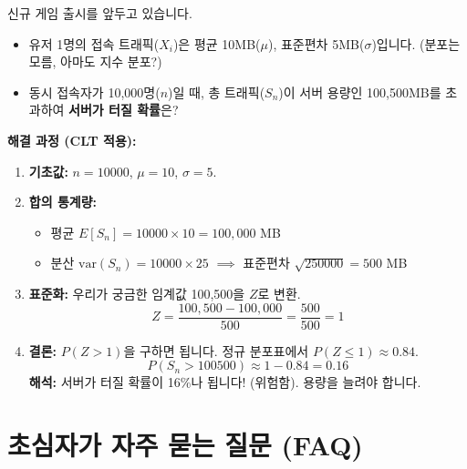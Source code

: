\documentclass[11pt,a4paper]{book}
\theoremstyle{definition}
\begin{document}
\begin{storybox}[title={넥슨 서버 개발자의 고민}]
신규 게임 출시를 앞두고 있습니다.
\begin{itemize}
    \item 유저 1명의 접속 트래픽($X_i$)은 평균 10MB($\mu$), 표준편차 5MB($\sigma$)입니다. (분포는 모름, 아마도 지수 분포?)
    \item 동시 접속자가 10,000명($n$)일 때, 총 트래픽($S_n$)이 서버 용량인 100,500MB를 초과하여 \textbf{서버가 터질 확률}은?
\end{itemize}

\textbf{해결 과정 (CLT 적용):}
\begin{enumerate}
    \item \textbf{기초값:} $n=10000$, $\mu=10$, $\sigma=5$.
    \item \textbf{합의 통계량:}
    \begin{itemize}
        \item 평균 $E[S_n] = 10000 \times 10 = 100,000$ MB
        \item 분산 $\text{var}(S_n) = 10000 \times 25$ $\implies$ 표준편차 $\sqrt{250000} = 500$ MB
    \end{itemize}
    \item \textbf{표준화:} 우리가 궁금한 임계값 100,500을 $Z$로 변환.
    \[ Z = \frac{100,500 - 100,000}{500} = \frac{500}{500} = 1 \]
    \item \textbf{결론:} $P(Z > 1)$을 구하면 됩니다. 정규 분포표에서 $P(Z \le 1) \approx 0.84$.
    \[ P(S_n > 100500) \approx 1 - 0.84 = 0.16 \]
    \textbf{해석:} 서버가 터질 확률이 16\%나 됩니다! (위험함). 용량을 늘려야 합니다.
\end{enumerate}
\end{storybox}

\section{초심자가 자주 묻는 질문 (FAQ)}
\end{document}
